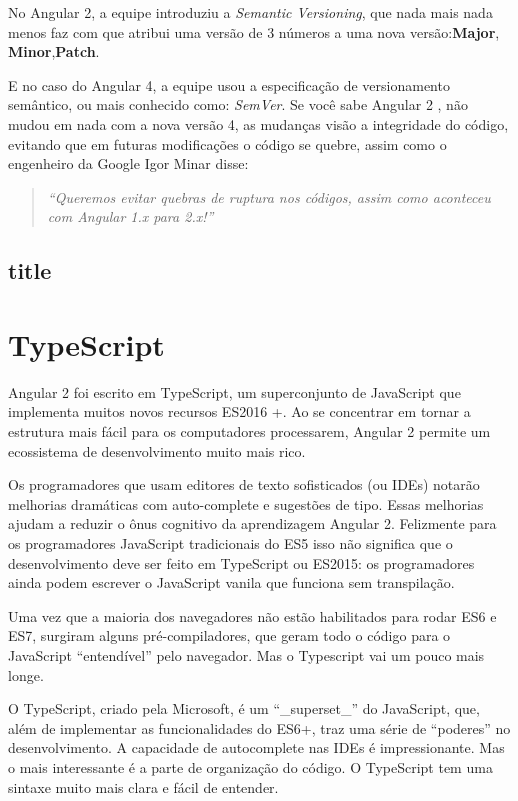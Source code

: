 \documentclass[12pt]{article}
\begin{document}
	No Angular 2, a equipe introduziu a \textit{Semantic Versioning}, que nada mais nada menos faz com que atribui uma versão de 3 números a uma nova versão:\textbf{Major}, \textbf{Minor},\textbf{Patch}.\cite{codeangular}
	
	E no caso do Angular 4, a equipe usou a especificação de versionamento semântico, ou mais conhecido como: \textit{SemVer}.
	Se você sabe Angular 2 , não mudou em nada com a nova versão 4, as mudanças visão a integridade do código, evitando que em futuras modificações o código se quebre, assim como o engenheiro da Google Igor Minar disse:
	\begin{quote}
		\textit{“Queremos evitar quebras de ruptura nos códigos, assim como aconteceu com Angular 1.x para 2.x!”}
	\end{quote}


\subsection{title}
\section{TypeScript} \label{sec:firstpage}

Angular 2 foi escrito em TypeScript, um superconjunto de JavaScript que implementa muitos novos recursos ES2016 +.
Ao se concentrar em tornar a estrutura mais fácil para os computadores processarem, Angular 2 permite um ecossistema de desenvolvimento muito mais rico.

Os programadores que usam editores de texto sofisticados (ou IDEs) notarão melhorias dramáticas com auto-complete e sugestões de tipo. Essas melhorias ajudam a reduzir o ônus cognitivo da aprendizagem Angular 2. Felizmente para os programadores JavaScript tradicionais do ES5 isso não significa que o desenvolvimento deve ser feito em TypeScript ou ES2015: os programadores ainda podem escrever o JavaScript vanila que funciona sem transpilação.

Uma vez que a maioria dos navegadores não estão habilitados para rodar ES6 e ES7, surgiram alguns pré-compiladores, que geram todo o código para o JavaScript “entendível” pelo navegador. Mas o Typescript vai um pouco mais longe.

O TypeScript, criado pela Microsoft, é um “\_superset\_” do JavaScript, que, além de implementar as funcionalidades do ES6+, traz uma série de “poderes” no desenvolvimento. A capacidade de autocomplete nas IDEs é impressionante. Mas o mais interessante é a parte de organização do código. O TypeScript tem uma sintaxe muito mais clara e fácil de entender.
\end{document}

